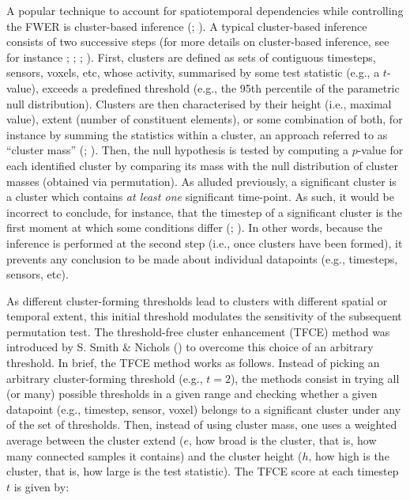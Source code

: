 \documentclass[
  doc,
  floatsintext,
  longtable,
  a4paper,
  nolmodern,
  notxfonts,
  notimes,
  donotrepeattitle,
  colorlinks=true,linkcolor=blue,citecolor=blue,urlcolor=blue]{apa7}
\begin{document}
A popular technique to account for spatiotemporal dependencies while
controlling the FWER is cluster-based inference
(;
). A typical
cluster-based inference consists of two successive steps (for more
details on cluster-based inference, see for instance
;
; ; ). First, clusters are defined as sets of contiguous
timesteps, sensors, voxels, etc, whose activity, summarised by some test
statistic (e.g., a \(t\)-value), exceeds a predefined threshold (e.g.,
the 95th percentile of the parametric null distribution). Clusters are
then characterised by their height (i.e., maximal value), extent (number
of constituent elements), or some combination of both, for instance by
summing the statistics within a cluster, an approach referred to as
``cluster mass'' (;
). Then, the null
hypothesis is tested by computing a \(p\)-value for each identified
cluster by comparing its mass with the null distribution of cluster
masses (obtained via permutation). As alluded previously, a significant
cluster is a cluster which contains \emph{at least one} significant
time-point. As such, it would be incorrect to conclude, for instance,
that the timestep of a significant cluster is the first moment at which
some conditions differ (; ).
In other words, because the inference is performed at the second step
(i.e., once clusters have been formed), it prevents any conclusion to be
made about individual datapoints (e.g., timesteps, sensors, etc).

As different cluster-forming thresholds lead to clusters with different
spatial or temporal extent, this initial threshold modulates the
sensitivity of the subsequent permutation test. The threshold-free
cluster enhancement (TFCE) method was introduced by S. Smith \& Nichols
() to overcome this choice of an arbitrary
threshold. In brief, the TFCE method works as follows. Instead of
picking an arbitrary cluster-forming threshold (e.g., \(t=2\)), the
methods consist in trying all (or many) possible thresholds in a given
range and checking whether a given datapoint (e.g., timestep, sensor,
voxel) belongs to a significant cluster under any of the set of
thresholds. Then, instead of using cluster mass, one uses a weighted
average between the cluster extend (\(e\), how broad is the cluster,
that is, how many connected samples it contains) and the cluster height
(\(h\), how high is the cluster, that is, how large is the test
statistic). The TFCE score at each timestep \(t\) is given by:
\end{document}
